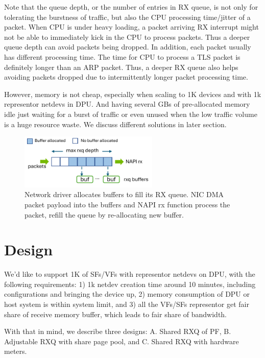 \documentclass[letterpaper]{article}
\begin{document}
Note that the queue depth, or the number of entries in RX queue, is
not only for tolerating the burstness of traffic, but also the CPU
processing time/jitter of a packet. When CPU is under heavy loading,
a packet arriving RX interrupt might not be able to immediately
kick in the CPU to process packets. Thus a deeper queue depth can
avoid packets being dropped.
In addition, each packet usually has different processing time.
The time for CPU to process a TLS packet is definitely longer than
an ARP packet. Thus, a deeper RX queue also helps avoiding packets
dropped due to intermittently longer packet processing time.

However, memory is not cheap, especially when scaling to 1K devices
and with 1k representor netdevs in DPU. And having several GBs of
pre-allocated memory idle just waiting for a burst of traffic
or even unused when the low traffic volume is a huge resource waste.
We discuss different solutions in later section.

\begin{figure}[t!]
\includegraphics[width=2.6in]{rxq.pdf}
\centering
\caption{Network driver allocates buffers to fill its RX queue. NIC DMA packet
payload into the buffers and NAPI rx function process the packet, refill the 
queue by re-allocating new buffer.}
\label{fig:rxq}
\end{figure}

\section{Design}
We'd like to support 1K of SFs/VFs with representor netdevs
on DPU, with the following requirements: 1) 1k netdev creation time
around 10 minutes, including configurations and bringing the device up,
2) memory consumption of DPU or host system is within
system limit, and 3) all the VFs/SFs representor get fair share
of receive memory buffer, which leads to fair share of bandwidth.

With that in mind, we describe three designs: A. Shared RXQ of PF,
B. Adjustable RXQ with share page pool, and C. Shared RXQ with hardware meters.

\end{document}
